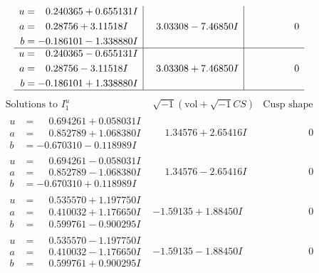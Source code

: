 \documentclass[1p]{elsarticle_modified}
\theoremstyle{definition}
\newcommand{\I}{\sqrt{-1}}
\begin{document}
$$\begin{array}{c|c|c}
\begin{aligned}
u &= \phantom{-}0.240365 + 0.655131 I \\
a &= \phantom{-}0.28756 + 3.11518 I \\
b &= -0.186101 - 1.338880 I\end{aligned}
 & \phantom{-}3.03308 - 7.46850 I & \phantom{-0.000000 } 0 \\ \hline\begin{aligned}
u &= \phantom{-}0.240365 - 0.655131 I \\
a &= \phantom{-}0.28756 - 3.11518 I \\
b &= -0.186101 + 1.338880 I\end{aligned}
 & \phantom{-}3.03308 + 7.46850 I & \phantom{-0.000000 } 0\\
 \hline 
 \end{array}$$\newpage$$\begin{array}{c|c|c}  
\text{Solutions to }I^u_{1}& \I (\text{vol} + \sqrt{-1}CS) & \text{Cusp shape}\\
 \hline 
\begin{aligned}
u &= \phantom{-}0.694261 + 0.058031 I \\
a &= \phantom{-}0.852789 + 1.068380 I \\
b &= -0.670310 - 0.118989 I\end{aligned}
 & \phantom{-}1.34576 + 2.65416 I & \phantom{-0.000000 } 0 \\ \hline\begin{aligned}
u &= \phantom{-}0.694261 - 0.058031 I \\
a &= \phantom{-}0.852789 - 1.068380 I \\
b &= -0.670310 + 0.118989 I\end{aligned}
 & \phantom{-}1.34576 - 2.65416 I & \phantom{-0.000000 } 0 \\ \hline\begin{aligned}
u &= \phantom{-}0.535570 + 1.197750 I \\
a &= \phantom{-}0.410032 + 1.176650 I \\
b &= \phantom{-}0.599761 - 0.900295 I\end{aligned}
 & -1.59135 + 1.88450 I & \phantom{-0.000000 } 0 \\ \hline\begin{aligned}
u &= \phantom{-}0.535570 - 1.197750 I \\
a &= \phantom{-}0.410032 - 1.176650 I \\
b &= \phantom{-}0.599761 + 0.900295 I\end{aligned}
 & -1.59135 - 1.88450 I & \phantom{-0.000000 } 0 \\ \hline\begin{aligned}

\end{aligned}
\end{array}$$
\end{document}
